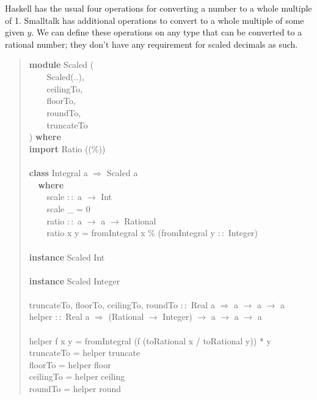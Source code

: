 \documentclass[prodmode,acmtoplas]{acmsmall}
\begin{document}
Haskell has the usual four operations for converting a number to
a whole multiple of 1.  Smalltalk has additional operations to
convert to a whole multiple of some given $y$.  We can define
these operations on any type that can be converted to a rational
number; they don't have any requirement for scaled decimals as such.

\begin{quote}
\begin{tabbing}
\sffamily \textbf{module} Scaled (\\
\verb|    |\sffamily    Scaled(..),\\
\verb|    |\sffamily    ceilingTo,\\
\verb|    |\sffamily    floorTo,\\
\verb|    |\sffamily    roundTo,\\
\verb|    |\sffamily    truncateTo\\
\sffamily ) \textbf{where}\\
\sffamily \textbf{import} Ratio ((\%))\\
\\
\sffamily \textbf{class} Integral a $\Rightarrow$ Scaled a\\
\verb|  |\sffamily  \textbf{where}\\
\verb|    |\sffamily    scale $::$ a $\rightarrow$ Int\\
\verb|    |\sffamily    scale \_ = 0\\
\verb|    |\sffamily    ratio $::$ a $\rightarrow$ a $\rightarrow$ Rational\\
\verb|    |\sffamily    ratio x y = fromIntegral x \% (fromIntegral y $::$ Integer)\\
\\
\sffamily \textbf{instance} Scaled Int\\
\\
\sffamily \textbf{instance} Scaled Integer\\
\\
\sffamily truncateTo, floorTo, ceilingTo, roundTo $::$ Real a $\Rightarrow$ a $\rightarrow$ a $\rightarrow$ a\\
\sffamily helper $::$ Real a $\Rightarrow$ (Rational $\rightarrow$ Integer) $\rightarrow$ a $\rightarrow$ a $\rightarrow$ a\\
\\
\sffamily helper f x y = fromIntegral (f (toRational x / toRational y)) * y\\
\sffamily truncateTo = helper truncate\\
\sffamily floorTo    = helper floor\\
\sffamily ceilingTo  = helper ceiling\\
\sffamily roundTo    = helper round
\end{tabbing}
\end{quote}
\end{document}
